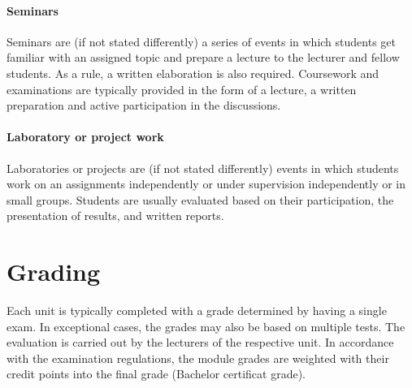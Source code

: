 \paragraph{Seminars} Seminars are (if not stated differently) a series of events in which students get familiar with an assigned topic and prepare a lecture to the lecturer and fellow students. 
As a rule, a written elaboration is also required. 
Coursework and examinations are typically provided in the form of a lecture, a written preparation and active participation in the discussions. 

\paragraph{Laboratory or project work}
Laboratories or projects are (if not stated differently) events in which students work on an assignments independently or under supervision independently or in small groups.
Students are usually evaluated based on their participation, the presentation of results, and written reports.

\section*{Grading}
Each unit is typically completed with a grade determined by having a single exam.
In exceptional cases, the grades may also be based on multiple tests. 
The evaluation is carried out by the lecturers of the respective unit. 
In accordance with the examination regulations, the module grades are weighted with their credit points into the final grade (Bachelor certificat grade).

